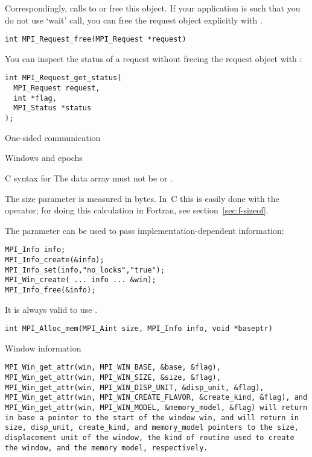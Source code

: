 Correspondingly, calls to  or 
free this object.
If your application is such that you do not use `wait' call, you can free the
request object explicitly
with .
\begin{verbatim}
int MPI_Request_free(MPI_Request *request)
\end{verbatim}

You can inspect the status of a request without freeing the request object
with :
\begin{verbatim}
int MPI_Request_get_status(
  MPI_Request request,
  int *flag,
  MPI_Status *status
);
\end{verbatim}

 {One-sided communication}

 {Windows and epochs}

C syntax for 
%
%
The data array must not be  or .

The size parameter is measured in bytes. In~C this is easily done
with the  operator;
for doing this calculation in Fortran, see section~\ref{sec:f-sizeof}.

The  parameter can be used to pass implementation-dependent 
information:
\begin{verbatim}
MPI_Info info;
MPI_Info_create(&info);
MPI_Info_set(info,"no_locks","true");
MPI_Win_create( ... info ... &win);
MPI_Info_free(&info);
\end{verbatim}
It is always valid to use .

\begin{verbatim}
int MPI_Alloc_mem(MPI_Aint size, MPI_Info info, void *baseptr)
\end{verbatim}

 {Window information}

\begin{verbatim}
MPI_Win_get_attr(win, MPI_WIN_BASE, &base, &flag), 
MPI_Win_get_attr(win, MPI_WIN_SIZE, &size, &flag), 
MPI_Win_get_attr(win, MPI_WIN_DISP_UNIT, &disp_unit, &flag), 
MPI_Win_get_attr(win, MPI_WIN_CREATE_FLAVOR, &create_kind, &flag), and 
MPI_Win_get_attr(win, MPI_WIN_MODEL, &memory_model, &flag) will return in base a pointer to the start of the window win, and will return in size, disp_unit, create_kind, and memory_model pointers to the size, displacement unit of the window, the kind of routine used to create the window, and the memory model, respectively.
\end{verbatim}

